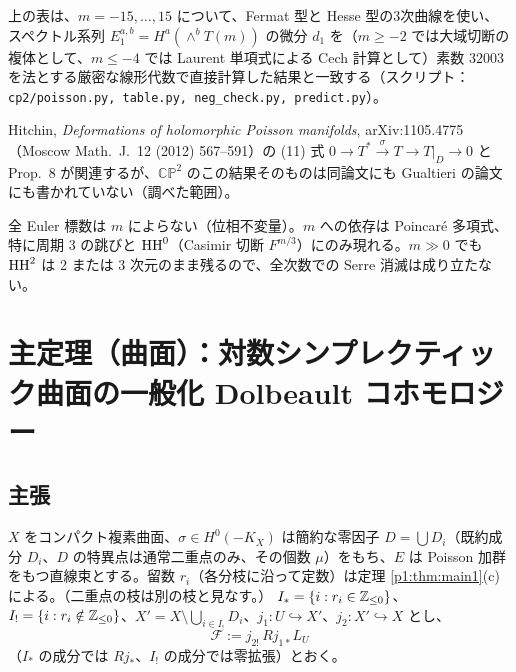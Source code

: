 \begin{rem}[\tV]
上の表は、$m=-15,\dots,15$ について、Fermat 型と Hesse 型の3次曲線を使い、スペクトル系列 $E_1^{a,b}=H^a(\wedge^bT(m))$ の微分 $d_1$ を（$m\ge-2$ では大域切断の複体として、$m\le-4$ では Laurent 単項式による Cech 計算として）素数 $32003$ を法とする厳密な線形代数で直接計算した結果と一致する（スクリプト：\texttt{cp2/poisson.py, table.py, neg\_check.py, predict.py}）。
\end{rem}
\begin{rem}[\tC\ 関連]
Hitchin, \emph{Deformations of holomorphic Poisson manifolds}, arXiv:1105.4775（Moscow Math.\ J.\ 12 (2012) 567--591）の (11) 式 $0\to T^*\xrightarrow{\sigma}T\to T|_D\to0$ と Prop.\ 8 が関連するが、$\mathbb{CP}^2$ のこの結果そのものは同論文にも Gualtieri の論文にも書かれていない（調べた範囲）。
\end{rem}

\begin{obs}\tP
全 Euler 標数は $m$ によらない（位相不変量）。$m$ への依存は Poincaré 多項式、特に周期 3 の跳びと $\mathrm{HH}^0$（Casimir 切断 $F^{m/3}$）にのみ現れる。$m\gg0$ でも $\mathrm{HH}^2$ は 2 または 3 次元のまま残るので、全次数での Serre 消滅は成り立たない。
\end{obs}
\section{主定理（曲面）：対数シンプレクティック曲面の一般化 Dolbeault コホモロジー}\label{p1:sec:main2}
\subsection{主張}
$X$ をコンパクト複素曲面、$\sigma\in H^0(-K_X)$ は簡約な零因子 $D=\bigcup D_i$（既約成分 $D_i$、$D$ の特異点は通常二重点のみ、その個数 $\mu$）をもち、$E$ は Poisson 加群をもつ直線束とする。留数 $r_i$（各分枝に沿って定数）は定理 \ref{p1:thm:main1}(c) による。（二重点の枝は別の枝と見なす。）
$I_*=\{i:r_i\in\mathbb Z_{\le0}\}$、$I_!=\{i:r_i\notin\mathbb Z_{\le0}\}$、$X'=X\setminus\bigcup_{i\in I_!}D_i$、$j_1:U\hookrightarrow X'$、$j_2:X'\hookrightarrow X$ とし、
\[\mathcal F:=j_{2!}\,Rj_{1*}L_U\]
（$I_*$ の成分では $Rj_*$、$I_!$ の成分では零拡張）とおく。

